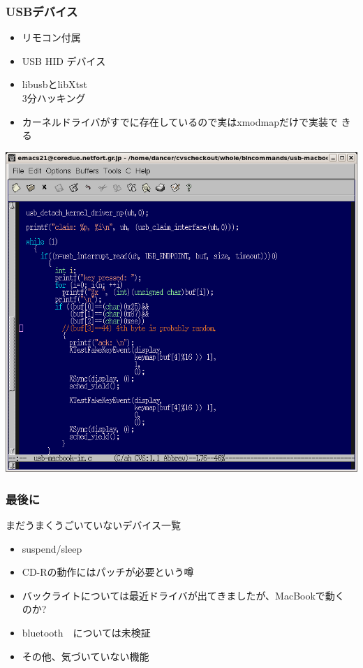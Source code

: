 \documentclass[cjk,dvipdfmx]{beamer}
\begin{document}
\begin{frame}
 \frametitle{USBデバイス}

\begin{minipage}[t]{0.4\hsize}
  \begin{itemize}
  \item<1-> リモコン付属
  \item<1-> USB HID デバイス
  \item<2-> libusbとlibXtst\\
       3分ハッキング
  \item<3-> カーネルドライバがすでに存在しているので実はxmodmapだけで実装で
	きる
 \end{itemize}
\end{minipage}
\begin{minipage}[t]{0.5\hsize}
 \includegraphics[width=2\hsize]{image200607/usbir.png}
\end{minipage}
\end{frame}



\begin{frame}
\frametitle{最後に}
まだうまくうごいていないデバイス一覧
\begin{itemize}
 \item suspend/sleep
 \item CD-Rの動作にはパッチが必要という噂
 \item バックライトについては最近ドライバが出てきましたが、MacBookで動く
       のか?
 \item bluetooth　については未検証
 \item その他、気づいていない機能
\end{itemize}
\end{frame}
\end{document}

